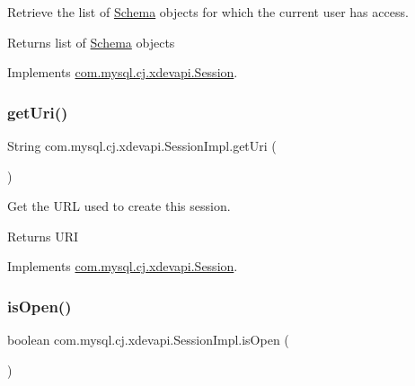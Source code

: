 Retrieve the list of \mbox{\hyperlink{interfacecom_1_1mysql_1_1cj_1_1xdevapi_1_1_schema}{Schema}} objects for which the current user has access.

\begin{DoxyReturn}{Returns}
list of \mbox{\hyperlink{interfacecom_1_1mysql_1_1cj_1_1xdevapi_1_1_schema}{Schema}} objects 
\end{DoxyReturn}


Implements \mbox{\hyperlink{interfacecom_1_1mysql_1_1cj_1_1xdevapi_1_1_session_ac2c871a98ae18a178d73e76c89655ed3}{com.\+mysql.\+cj.\+xdevapi.\+Session}}.

\mbox{\label{classcom_1_1mysql_1_1cj_1_1xdevapi_1_1_session_impl_af181caf1c47641912a47ef9445a9ddca}} 
\subsubsection{\texorpdfstring{get\+Uri()}{getUri()}}
{\footnotesize\ttfamily String com.\+mysql.\+cj.\+xdevapi.\+Session\+Impl.\+get\+Uri (\begin{DoxyParamCaption}{ }\end{DoxyParamCaption})}

Get the U\+RL used to create this session.

\begin{DoxyReturn}{Returns}
U\+RI 
\end{DoxyReturn}


Implements \mbox{\hyperlink{interfacecom_1_1mysql_1_1cj_1_1xdevapi_1_1_session_a8c5c670815d5fab8edb586c4a4e684ac}{com.\+mysql.\+cj.\+xdevapi.\+Session}}.

\mbox{\label{classcom_1_1mysql_1_1cj_1_1xdevapi_1_1_session_impl_a0b6cff692d4e7882a546118b25820978}} 
\subsubsection{\texorpdfstring{is\+Open()}{isOpen()}}
{\footnotesize\ttfamily boolean com.\+mysql.\+cj.\+xdevapi.\+Session\+Impl.\+is\+Open (\begin{DoxyParamCaption}{ }\end{DoxyParamCaption})}

